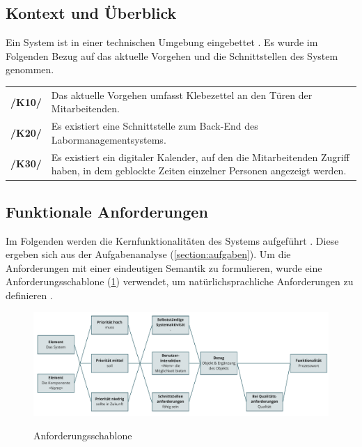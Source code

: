 \subsection*{Kontext und Überblick}
\label{section:kontextueberblick}
Ein System ist in einer technischen Umgebung eingebettet \cite{balzert2009}. Es
wurde im Folgenden Bezug auf das aktuelle Vorgehen und die Schnittstellen des
System genommen.

\begin{center}
        \renewcommand{\arraystretch}{1.5}
        \begin{tabular}{p{}p{}}
                \hline
                \textbf{/K10/} & Das aktuelle Vorgehen umfasst Klebezettel an
                den Türen der Mitarbeitenden.                                 \\
                \textbf{/K20/} & Es existiert eine Schnittstelle zum Back-End
                des Labormanagementsystems.                                   \\
                \textbf{/K30/} & Es existiert ein digitaler Kalender, auf den
                die Mitarbeitenden Zugriff haben, in dem geblockte Zeiten
                einzelner Personen angezeigt werden.                          \\
                \hline
        \end{tabular}
\end{center}

\subsection*{Funktionale Anforderungen}
\label{section:funktionale}
Im Folgenden werden die Kernfunktionalitäten des Systems aufgeführt
\cite{balzert2009}. Diese ergeben sich aus der Aufgabenanalyse
(\ref{section:aufgaben}). Um die Anforderungen mit einer eindeutigen Semantik zu
formulieren, wurde eine Anforderungsschablone (\ref{fig:schablone}) verwendet,
um natürlichsprachliche Anforderungen zu definieren \cite{balzert2009}.

\begin{figure}[h]
        \centering
        \includegraphics[scale=0.45]{Bilder/anforderungsschablone.pdf}
        \label{fig:schablone}
        \caption[Anforderungsschablone]{Anforderungsschablone
                \cite{balzert2009}}
\end{figure}


